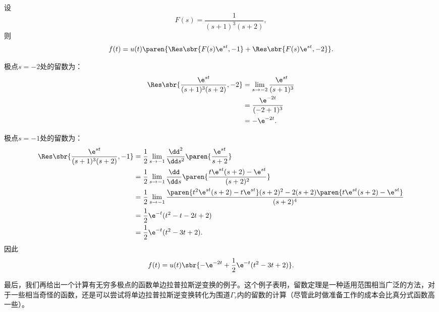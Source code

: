 \begin{example}
    设
    \begin{equation}
        F(s)=\frac{1}{(s+1)^3(s+2)},
    \end{equation}
    则
    \begin{equation}
        f(t)=u(t)\paren{\Res\sbr{F(s)\e^{st},-1}+\Res\sbr{F(s)\e^{st},-2}}.
    \end{equation}

    极点$s=-2$处的留数为：
    \begin{align}
        \Res\sbr{\frac{\e^{st}}{(s+1)^3(s+2)},-2}
        &=\lim_{s\to -2}\frac{\e^{st}}{(s+1)^3}\nonumber\\
        &=\frac{\e^{-2t}}{(-2+1)^3}\nonumber\\
        &=-\e^{-2t}.
    \end{align}

    极点$s=-1$处的留数为：
    \begin{align}
        \Res\sbr{\frac{\e^{st}}{(s+1)^3(s+2)},-1}
        &=\frac{1}{2}\lim_{s\to -1}\frac{\dd^2}{\dd s^2}\paren{\frac{\e^{st}}{s+2}}\nonumber\\
        &=\frac{1}{2}\lim_{s\to -1}\frac{\dd}{\dd s}\paren{\frac{t\e^{st}(s+2)-\e^{st}}{(s+2)^2}}\nonumber\\
        &=\frac{1}{2}\lim_{s\to -1}\frac{\paren{t^2\e^{st}(s+2)-t\e^{st}}(s+2)^2-2(s+2)\paren{t\e^{st}(s+2)-\e^{st}}}{(s+2)^4}\nonumber\\
        &=\frac{1}{2}\e^{-t}(t^2-t-2t+2)\nonumber\\
        &=\frac{1}{2}\e^{-t}(t^2-3t+2).
    \end{align}
    因此
    \begin{equation}
        f(t)=u(t)\sbr{-\e^{-2t}+\frac{1}{2}\e^{-t}(t^2-3t+2)}.
    \end{equation}
\end{example}

最后，我们再给出一个计算有无穷多极点的函数单边拉普拉斯逆变换的例子\cite{folland}。这个例子表明，留数定理是一种适用范围相当广泛的方法，对于一些相当奇怪的函数，还是可以尝试将单边拉普拉斯逆变换转化为围道$\Gamma_r$内的留数的计算（尽管此时做准备工作的成本会比真分式函数高一些）。

